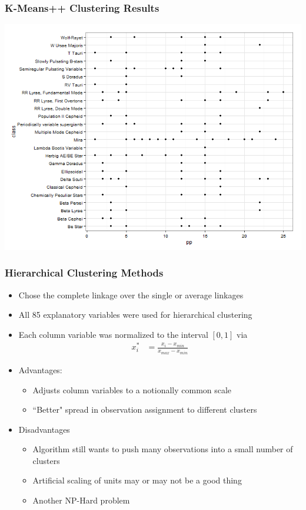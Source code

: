 \documentclass{beamer}
\begin{document}

\begin{frame}
\frametitle{K-Means++ Clustering Results}
\begin{center}
\includegraphics[scale=.4]{pp.png}
\end{center}
\end{frame}


\begin{frame}
	\frametitle{Hierarchical Clustering Methods}
		\begin{itemize}
			\item Chose the complete linkage over the single or average linkages
			\item All 85 explanatory variables were used for hierarchical clustering
			\item Each column variable was normalized to the interval $[0,1]$ via
				\begin{align*}
					x_i^{*} &= \frac{x_i-x_{min}}{x_{max}-x_{min}}
				\end{align*}
			\item Advantages:
			\begin{itemize}
				\item Adjusts column variables to a notionally common scale
				\item ``Better" spread in observation assignment to different clusters
			\end{itemize}
			\item Disadvantages
			\begin{itemize}
				\item Algorithm still wants to push many observations into a small number of clusters
				\item Artificial scaling of units may or may not be a good thing
				\item Another NP-Hard problem
			\end{itemize}
		\end{itemize}
\end{frame}
\end{document}

